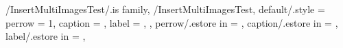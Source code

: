 \newcommand\MultiImageTotalValue{0}
\newcommand{\SetMultiImageTotalValue}[1]
  {\renewcommand{\MultiImageTotalValue}{#1}}
\newcommand{\GetMultiImageTotalValue}[0]{\MultiImageTotalValue}

\newcommand\MultiImageId{0}
\newcommand{\SetMultiImageId}[1]
  {\renewcommand{\MultiImageId}{#1}}
\newcommand{\GetMultiImageId}[0]{\MultiImageId}

%
%
\newcommand\WidthOfImagePerRow{0}

\pgfkeys
{
  /InsertMultiImagesTest/.is family, /InsertMultiImagesTest,
  default/.style = 
  {
    perrow = 1,
    caption = \empty,
    label = \empty,
  },
  perrow/.estore in = \InsertMultiImagesTestValueImagePerRow,
  caption/.estore in = \InsertMultiImagesTestValueCaption,
  label/.estore in = \InsertMultiImagesTestValueLabel,
} %


